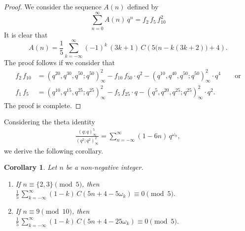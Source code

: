 \documentclass{article}
\newtheorem{corollary}[theorem]{Corollary}
\begin{document}
\begin{proof}
		We consider the sequence $A(n)$ defined by
	$$
	\sum_{n=0}^\infty A(n)\,q^n = f_2\, f_5\,f_{10}^2
	$$
		It is clear that
	$$
	A(n)=\frac{1}{5} \sum_{k=-\infty}^\infty (-1)^k\,(3k+1)\, C\left(5\big(n-k(3k+2)\big)+4\right).
	$$
	The proof follows if we consider that
	\begin{align*}
	f_2\,f_{10} & = (q^{20},q^{30},q^{50};q^{50})_\infty^2 - f_{10}\,f_{50}\cdot 
         q^2 - (q^{10},q^{40},q^{50};q^{50})_\infty^2\cdot q^4 \qquad \text{or}   \\
	f_1\,f_{5} &= (q^{10},q^{15},q^{25};q^{25})_\infty^2 - f_{5}\,f_{25}\cdot 
           q - (q^{5},q^{20},q^{25};q^{25})_\infty^2\cdot q^2. 
	\end{align*}
The proof is complete.
\end{proof}

Considering the theta identity  \cite[Eq. (0.48), p. 17]{Cooper}
\begin{align*}
\frac{(q;q)_\infty^5}{(q^2;q^2)_\infty^2}
= \sum_{n=-\infty}^{\infty} (1-6n)\,q^{\omega_n}, 
\end{align*}
we derive the following corollary.

\medskip
\begin{corollary} 
	Let $n$ be a non-negative integer.
	\begin{enumerate}
		\item[(a)] 	If $n\equiv \{2,3\} \pmod {5}$, then	$\frac{1}{5}\,\sum\limits_{k=-\infty}^\infty (1-k)\, C\left(5n+4-5\omega_k\right)
\equiv 0 \pmod 5.$
		\item[(b)] If $n\equiv 9 \pmod {10}$, then		$\frac{1}{5}\, \sum\limits_{k=-\infty}^\infty (1-k)\, C\left(5n+4-25\omega_k\right)
\equiv 0 \pmod 5.
$
	\end{enumerate}
\end{corollary}
\medskip
\end{document}
